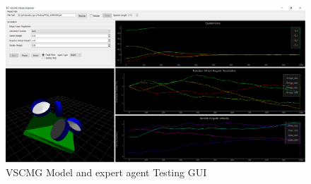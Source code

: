 \begin{figure}[H]
    \centering
    \includegraphics[width=\textwidth]{figures/AI/ModelExplorer1.pdf}
    \caption{VSCMG Model and expert agent Testing GUI}
    \label{fig:model_explorer}
\end{figure}

